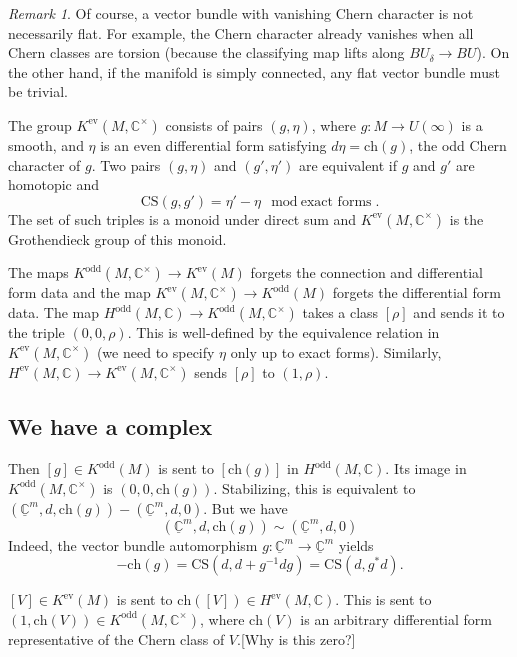 \documentclass[a4paper]{book}
\newcommand{\bC}{\mathbb{C}}
\newcommand{\ch}{\mathrm{ch}}
\theoremstyle{definition}
\theoremstyle{remark}
\newtheorem{remark}[equation]{Remark}
\numberwithin{equation}{section}
\begin{document}
\begin{remark}
Of course, a vector bundle with vanishing Chern character is not necessarily flat. For example, the Chern character already vanishes when all Chern classes are torsion (because the classifying map lifts along $BU_\delta \to BU$). On the other hand, if the manifold is simply connected, any flat vector bundle must be trivial. 
\end{remark}

The group $K^{\mathrm{ev}}(M, \bC^\times)$ consists of pairs $(g, \eta)$, where $g : M \to U(\infty)$ is a smooth, and $\eta$ is an even differential form satisfying $d\eta = \ch(g)$, the odd Chern character of $g$. Two pairs $(g, \eta)$ and $(g', \eta')$ are equivalent if $g$ and $g'$ are homotopic and 
\[
\mathrm{CS}(g, g') = \eta' - \eta \mod \text{exact forms}.
\]
The set of such triples is a monoid under direct sum and $K^{\mathrm{ev}}(M, \bC^\times)$ is the Grothendieck group of this monoid.

The maps $K^{\mathrm{odd}}(M, \bC^\times) \to K^{\mathrm{ev}}(M)$ forgets the connection and differential form data and the map $K^{\mathrm{ev}}(M, \bC^\times) \to K^{\mathrm{odd}}(M)$ forgets the differential form data. The map $H^{\mathrm{odd}}(M, \bC) \to K^{\mathrm{odd}}(M, \bC^\times)$ takes a class $[\rho]$ and sends it to the triple $(0, 0, \rho)$. This is well-defined by the equivalence relation in $K^{\mathrm{ev}}(M, \bC^\times)$ (we need to specify $\eta$ only up to exact forms). Similarly, $H^{\mathrm{ev}}(M, \bC) \to K^{\mathrm{ev}}(M, \bC^\times)$ sends $[\rho]$ to $(1, \rho)$.

\subsection{We have a complex}
Then $[g] \in K^{\mathrm{odd}}(M)$ is sent to $[\ch(g)]$ in $H^{\mathrm{odd}}(M, \bC)$. Its image in $K^{\mathrm{odd}}(M, \bC^\times)$ is $(0, 0, \ch(g))$. Stabilizing, this is equivalent to $(\underline{\bC}^m, d, \ch(g)) - (\underline{\bC}^m, d, 0)$. But we have
\[
(\underline{\bC}^m, d, \ch(g)) \sim (\underline{\bC}^m, d, 0)
\]
Indeed, the vector bundle automorphism $g: \underline{\bC}^m \to \underline{\bC}^m$ yields
\[
- \ch(g) = \mathrm{CS}(d, d + g^{-1}dg) = \mathrm{CS}(d, g^*d).
\]

$[V] \in K^{\mathrm{ev}}(M)$ is sent to $\ch([V]) \in H^{\mathrm{ev}}(M, \bC)$.
This is sent to $(1, \ch(V))\in K^{\mathrm{odd}}(M, \bC^\times)$, where $\ch(V)$ is an arbitrary differential form representative of the Chern class of $V$.{\color{red}[Why is this zero?]}
\end{document}
